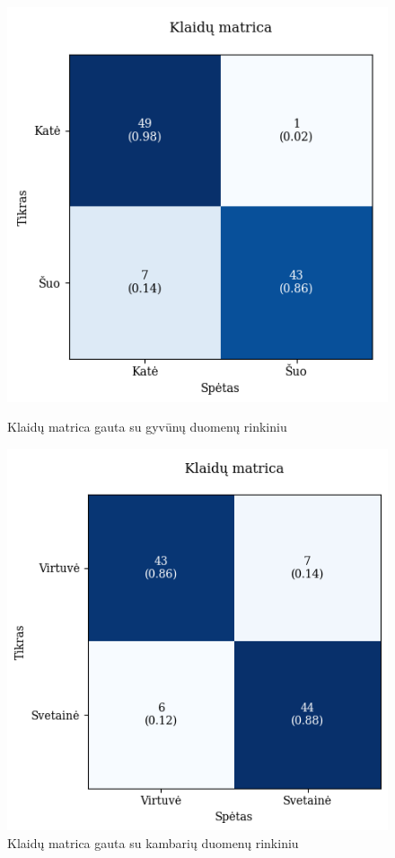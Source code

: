 \documentclass{VUMIFPSbakalaurinis}
\begin{document}
\begin{figure}[!htbp]
    \centering
    \begin{minipage}[b]{0.48\textwidth}
      \includegraphics[width=\textwidth]{img/GrapthsNEW/Large/animal/5/KM_DC_L_5.png}
      \caption{Klaidų matrica gauta su gyvūnų duomenų rinkiniu}
    \end{minipage}
    \hspace{2mm}
    \begin{minipage}[b]{0.48\textwidth}
      \includegraphics[width=\textwidth]{img/GrapthsNEW/Large/room/5/KM_R_L_5.png}
      \caption{Klaidų matrica gauta su kambarių duomenų rinkiniu}
    \end{minipage}
\end{figure}
\end{document}
